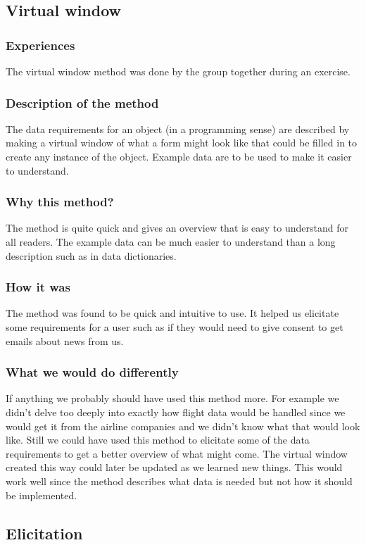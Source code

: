 \subsection{Virtual window}
\subsubsection{Experiences}
The virtual window method was done by the group together during an exercise.
\subsubsection{Description of the method}
The data requirements for an object (in a programming sense) are described by making a virtual window of what a form might look like that could be filled in to create any instance of the object. Example data are to be used to make it easier to understand.
\subsubsection{Why this method?}
The method is quite quick and gives an overview that is easy to understand for all readers. The example data can be much easier to understand than a long description such as in data dictionaries.
\subsubsection{How it was}
The method was found to be quick and intuitive to use. It helped us elicitate some requirements for a user such as if they would need to give consent to get emails about news from us.
\subsubsection{What we would do differently}
If anything we probably should have used this method more. For example we didn't delve too deeply into exactly how flight data would be handled since we would get it from the airline companies and we didn't know what that would look like. Still we could have used this method to elicitate some of the data requirements to get a better overview of what might come. The virtual window created this way could later be updated as we learned new things. This would work well since the method describes what data is needed but not how it should be implemented.

\subsection{Elicitation}
